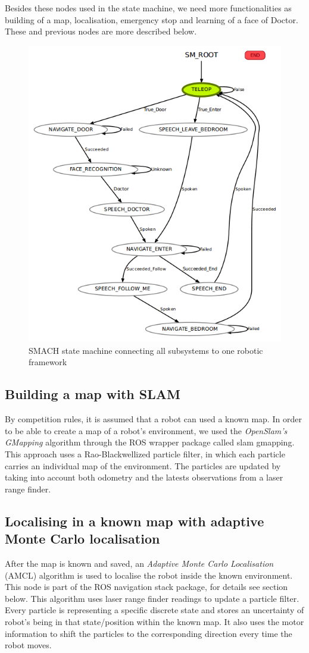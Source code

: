 \documentclass[conference]{IEEEtran}
\begin{document}
Besides these nodes used in the state machine, we need more functionalities as building of a map, localisation, emergency stop and learning of a face of Doctor. These and previous nodes are more described below.

\begin{figure}[!htb]
\centering
\includegraphics[width=3.in]{state_machine.png}
\caption{SMACH state machine connecting all subsystems to one robotic framework}
\label{fig:smach}
\end{figure}


\subsection{Building a map with SLAM}
By competition rules, it is assumed that a robot can used a known map. In order to be able to create a map of a robot's environment, we used the \textit{OpenSlam's GMapping} algorithm \cite{slam} through the ROS wrapper package called \textsf{slam gmapping}. This approach uses a Rao-Blackwellized particle filter, in which each particle carries an individual map of the environment.  The particles are updated by taking into account both odometry and the latests observations from a laser range finder.

\subsection{Localising in a known map with adaptive Monte Carlo localisation}
After the map is known and saved, an \textit{Adaptive Monte Carlo Localisation} (AMCL) algorithm \cite{amcl} is used to localise the robot inside the known environment. This node is part of the ROS \textsf{navigation stack} package, for details see section below. 
This algorithm uses laser range finder readings to update a particle filter. Every particle is representing a specific discrete state and stores an uncertainty of robot's being in that state/position within the known map. It also uses the motor information to shift the particles to the corresponding direction every time the robot moves. 
\end{document}
